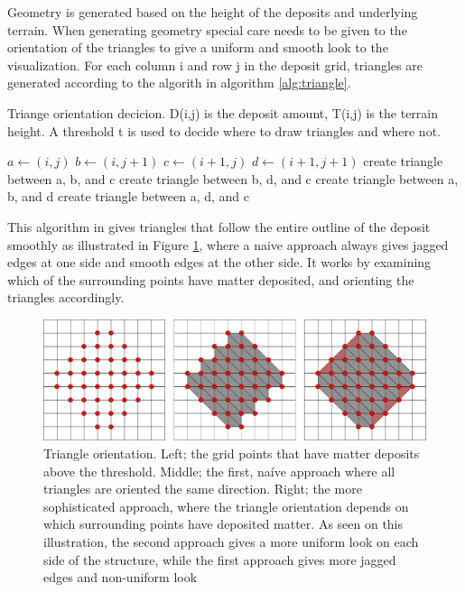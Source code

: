 \documentclass[a4paper,12pt]{report}
\newcommand{\And}{\textbf{ and }}
\begin{document}
Geometry is generated based on the height of the deposits and underlying terrain. When generating geometry special care needs to be given to the orientation of the triangles to give a uniform and smooth look to the visualization. For each column i and row j in the deposit grid, triangles are generated according to the algorith in algorithm \ref{alg:triangle}. 

\begin{algorithm}

 \caption{Triange orientation decicion. D(i,j) is the deposit amount, T(i,j) is the terrain height. A threshold t is used to decide where to draw triangles and where not.}
 \label{alg:triangle}
 \begin{algorithmic}
 
  \State $a \gets (i,j)$
  \State $b \gets (i,j+1)$
  \State $c \gets (i+1,j)$
  \State $d \gets (i+1, j+1)$
  \If {$D(c) > t \And D(b) > t$}
	\State create triangle between a, b, and c
     \EndIf
	\State create triangle between b, d, and c
     \EndIf
  \ElsIf {$D(a) > t \And D(d) > t$}
	\State create triangle between a, b, and d
     \EndIf
	\State create triangle between a, d, and c
     \EndIf
  \EndIf
  \EndFor
  
  \EndFor
  
 \end{algorithmic}

\end{algorithm}


  
This algorithm in gives triangles that follow the entire outline of the deposit smoothly as illustrated in Figure \ref{fig:triangleOrient}, where a naive approach always gives jagged edges at one side and smooth edges at the other side. It works by examining which of the surrounding points have matter deposited, and orienting the triangles accordingly.

\begin{figure}
 \includegraphics[width=\linewidth]{thesis/gridtrianglesall.pdf}
 \caption{Triangle orientation. Left; the grid points that have matter deposits above the threshold. Middle; the first, naíve approach where all triangles are oriented the same direction. Right; the more sophisticated approach, where the triangle orientation depends on which surrounding points have deposited matter. As seen on this illustration, the second approach gives a more uniform look on each side of the structure, while the first approach gives more jagged edges and non-uniform look}
 \label{fig:triangleOrient}
\end{figure}
\end{document}
